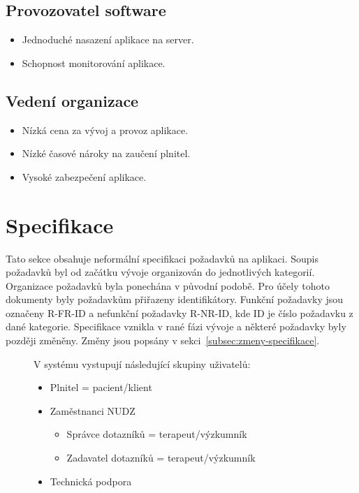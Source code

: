 \subsection*{Provozovatel software}\label{subsec:provozovatel-spravce-software}

\begin{itemize}
    \item
    Jednoduché nasazení aplikace na server.
    \item
    Schopnost monitorování aplikace.
\end{itemize}

\subsection*{Vedení organizace}\label{subsec:vedeni-organizace}

\begin{itemize}
    \item
    Nízká cena za vývoj a provoz aplikace.
    \item
    Nízké časové nároky na zaučení plnitel.
    \item
    Vysoké zabezpečení aplikace.
\end{itemize}


\section{Specifikace}\label{sec:specifikace}

Tato sekce obsahuje neformální specifikaci požadavků na aplikaci.
Soupis požadavků byl od začátku vývoje organizován do jednotlivých kategorií.
Organizace požadavků byla ponechána v původní podobě.
Pro účely tohoto dokumenty byly požadavkům přiřazeny identifikátory.
Funkční požadavky jsou označeny R-FR-ID a nefunkční požadavky R-NR-ID, kde ID je číslo požadavku z dané kategorie.
Specifikace vznikla v rané fázi vývoje a některé požadavky byly později změněny.
Změny jsou popsány v sekci~\ref{subsec:zmeny-specifikace}.

\begin{description}
    \item[]
    V systému vystupují následující skupiny uživatelů:

    \begin{itemize}
        \item
        Plnitel = pacient/klient

        \item
        Zaměstnanci NUDZ

        \begin{itemize}
            \item
            Správce dotazníků = terapeut/výzkumník
            \item
            Zadavatel dotazníků = terapeut/výzkumník
        \end{itemize}
        \item
        Technická podpora
    \end{itemize}

\end{description}

